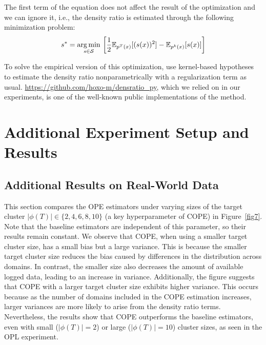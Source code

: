 The first term of the equation does not affect the result of the optimization and we can ignore it, i.e., the density ratio is estimated through the following minimization problem:
$$
s^{*}=\underset{s \in \mathcal{S}}{\operatorname*{arg\,min}} \, \left[\frac{1}{2} \mathbb{E}_{p^{T}(x)} [(s(x))^{2}]-\mathbb{E}_{p^k(x)} [s(x)] \right]
$$

To solve the empirical version of this optimization, \cite{kanamori2012statistical} use kernel-based hypotheses to estimate the density ratio nonparametrically with a regularization term as usual. \href{https://github.com/hoxo-m/densratio_py}{https://github.com/hoxo-m/densratio\_py}, which we relied on in our experiments, is one of the well-known public implementations of the method.


\section{Additional Experiment Setup and Results}

\subsection{Additional Results on Real-World Data} \label{app:real}
This section compares the OPE estimators under varying sizes of the target cluster $|\phi(T)| \in \{2, 4, 6, 8, 10\}$ (a key hyperparameter of COPE) in Figure~\ref{fig7}. Note that the baseline estimators are independent of this parameter, so their results remain constant. We observe that COPE, when using a smaller target cluster size, has a small bias but a large variance. This is because the smaller target cluster size reduces the bias caused by differences in the distribution across domains. In contrast, the smaller size also decreases the amount of available logged data, leading to an increase in variance. Additionally, the figure suggests that COPE with a larger target cluster size exhibits higher variance. This occurs because as the number of domains included in the COPE estimation increases, larger variances are more likely to arise from the density ratio terms. Nevertheless, the results show that COPE outperforms the baseline estimators, even with small ($|\phi(T)|=2$) or large ($|\phi(T)|=10$) cluster sizes, as seen in the OPL experiment.

